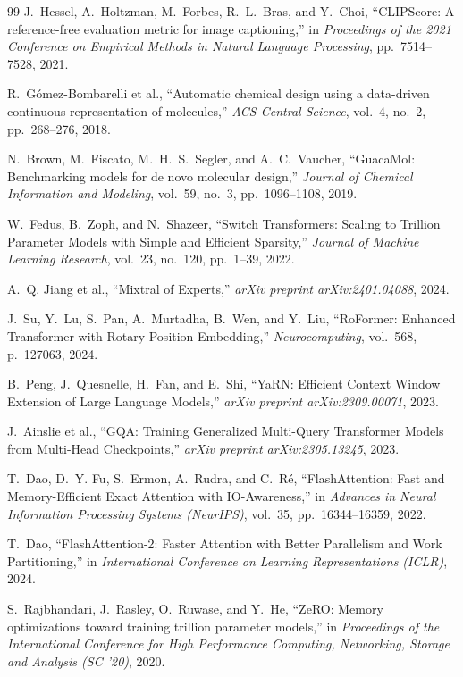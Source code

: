 \documentclass{book}
\begin{document}
\begin{thebibliography}{99}
J.~Hessel, A.~Holtzman, M.~Forbes, R.~L.~Bras, and Y.~Choi, ``CLIPScore: A reference-free evaluation metric for image captioning,'' in \textit{Proceedings of the 2021 Conference on Empirical Methods in Natural Language Processing}, pp.~7514--7528, 2021.
 
R.~G\'{o}mez-Bombarelli et al., ``Automatic chemical design using a data-driven continuous representation of molecules,'' \textit{ACS Central Science}, vol.~4, no.~2, pp.~268--276, 2018.
 
N.~Brown, M.~Fiscato, M.~H.~S.~Segler, and A.~C.~Vaucher, ``GuacaMol: Benchmarking models for de novo molecular design,'' \textit{Journal of Chemical Information and Modeling}, vol.~59, no.~3, pp.~1096--1108, 2019.
 
W.~Fedus, B.~Zoph, and N.~Shazeer, ``Switch Transformers: Scaling to Trillion Parameter Models with Simple and Efficient Sparsity,'' \textit{Journal of Machine Learning Research}, vol.~23, no.~120, pp.~1--39, 2022.
 
A.~Q. Jiang et al., ``Mixtral of Experts,'' \textit{arXiv preprint arXiv:2401.04088}, 2024.
 
J.~Su, Y.~Lu, S.~Pan, A.~Murtadha, B.~Wen, and Y.~Liu, ``RoFormer: Enhanced Transformer with Rotary Position Embedding,'' \textit{Neurocomputing}, vol.~568, p.~127063, 2024.
 
B.~Peng, J.~Quesnelle, H.~Fan, and E.~Shi, ``YaRN: Efficient Context Window Extension of Large Language Models,'' \textit{arXiv preprint arXiv:2309.00071}, 2023.
 
J.~Ainslie et al., ``GQA: Training Generalized Multi-Query Transformer Models from Multi-Head Checkpoints,'' \textit{arXiv preprint arXiv:2305.13245}, 2023.
 
T.~Dao, D.~Y. Fu, S.~Ermon, A.~Rudra, and C.~R\'{e}, ``FlashAttention: Fast and Memory-Efficient Exact Attention with IO-Awareness,'' in \textit{Advances in Neural Information Processing Systems (NeurIPS)}, vol.~35, pp.~16344--16359, 2022.
 
T.~Dao, ``FlashAttention-2: Faster Attention with Better Parallelism and Work Partitioning,'' in \textit{International Conference on Learning Representations (ICLR)}, 2024.
 
S.~Rajbhandari, J.~Rasley, O.~Ruwase, and Y.~He, ``ZeRO: Memory optimizations toward training trillion parameter models,'' in \textit{Proceedings of the International Conference for High Performance Computing, Networking, Storage and Analysis (SC '20)}, 2020.
 

\end{thebibliography}
\end{document}
